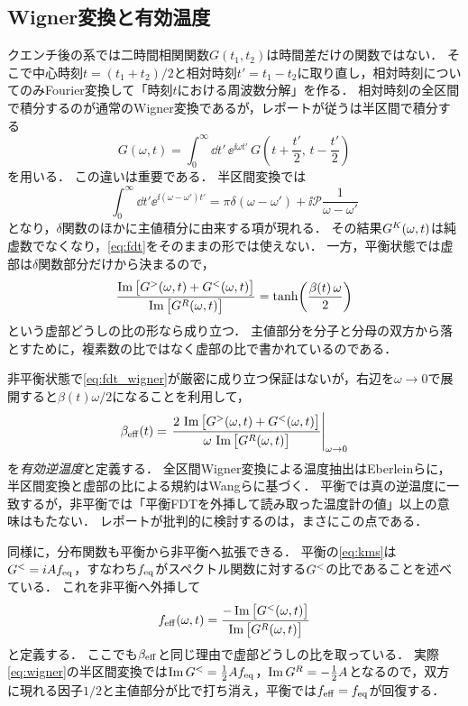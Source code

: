 \documentclass[a4paper,11pt,onecolumn]{jlreq}
\begin{document}
\subsection{Wigner変換と有効温度}
\label{sec:keldysh_wigner}

クエンチ後の系では二時間相関関数$G(t_1,t_2)$は時間差だけの関数ではない．
そこで中心時刻$t=(t_1+t_2)/2$と相対時刻$t'=t_1-t_2$に取り直し，相対時刻についてのみFourier変換して「時刻$t$における周波数分解」を作る．
相対時刻の全区間で積分するのが通常のWigner変換であるが，レポートが従う\cite{Wang2024}は半区間で積分する
\begin{equation}
  G(\omega,t) = \int_0^{\infty}\dd{t'}\,\ee^{\ii\omega t'}\,
  G\!\left(t+\frac{t'}{2},\,t-\frac{t'}{2}\right)
  \label{eq:wigner}
\end{equation}
を用いる．
この違いは重要である．
半区間変換では
\begin{equation}
  \int_0^{\infty}\dd{t'}\ee^{\ii(\omega-\omega')t'}
  = \pi\delta(\omega-\omega') + \ii\mathcal{P}\frac{1}{\omega-\omega'}
  \label{eq:half_transform}
\end{equation}
となり，$\delta$関数のほかに主値積分に由来する項が現れる．
その結果$G^{K}(\omega,t)$は純虚数でなくなり，\eqref{eq:fdt}をそのままの形では使えない．
一方，平衡状態では虚部は$\delta$関数部分だけから決まるので，
\begin{equation}
  \frac{\Im\big[G^{>}(\omega,t)+G^{<}(\omega,t)\big]}{\Im\big[G^{R}(\omega,t)\big]}
  = \tanh\!\left(\frac{\beta(t)\,\omega}{2}\right)
  \label{eq:fdt_wigner}
\end{equation}
という虚部どうしの比の形なら成り立つ．
主値部分を分子と分母の双方から落とすために，複素数の比ではなく虚部の比で書かれているのである．

非平衡状態で\eqref{eq:fdt_wigner}が厳密に成り立つ保証はないが，右辺を$\omega\to0$で展開すると$\beta(t)\omega/2$になることを利用して，
\begin{equation}
  \beta_{\mathrm{eff}}(t) = \left.
  \frac{2\,\Im\big[G^{>}(\omega,t)+G^{<}(\omega,t)\big]}
       {\omega\,\Im\big[G^{R}(\omega,t)\big]}
  \right|_{\omega\to0}
  \label{eq:beta_eff}
\end{equation}
を\emph{有効逆温度}と定義する\cite{Eberlein2017,Wang2024}．
全区間Wigner変換による温度抽出はEberleinらに，半区間変換と虚部の比による規約はWangらに基づく．
平衡では真の逆温度に一致するが，非平衡では「平衡FDTを外挿して読み取った温度計の値」以上の意味はもたない．
レポートが批判的に検討するのは，まさにこの点である．

同様に，分布関数も平衡から非平衡へ拡張できる．
平衡の\eqref{eq:kms}は$G^{<}=i Af_{\mathrm{eq}}$，すなわち$f_{\mathrm{eq}}$がスペクトル関数に対する$G^{<}$の比であることを述べている．
これを非平衡へ外挿して
\begin{equation}
  f_{\mathrm{eff}}(\omega,t) = \frac{-\Im\big[G^{<}(\omega,t)\big]}{\Im\big[G^{R}(\omega,t)\big]}
  \label{eq:f_eff}
\end{equation}
と定義する．
ここでも$\beta_{\mathrm{eff}}$と同じ理由で虚部どうしの比を取っている．
実際\eqref{eq:wigner}の半区間変換では$\Im G^{<}=\tfrac{1}{2}Af_{\mathrm{eq}}$，$\Im G^{R}=-\tfrac{1}{2}A$となるので，双方に現れる因子$1/2$と主値部分が比で打ち消え，平衡では$f_{\mathrm{eff}}=f_{\mathrm{eq}}$が回復する．
\end{document}

